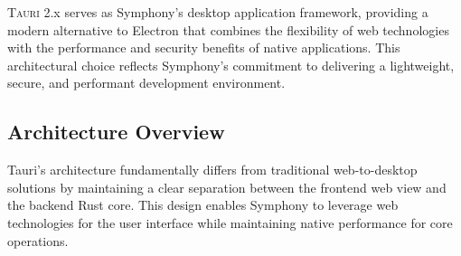 
\lettrine{T}{auri} 2.x serves as Symphony's desktop application framework, providing a modern alternative to Electron that combines the flexibility of web technologies with the performance and security benefits of native applications. This architectural choice reflects Symphony's commitment to delivering a lightweight, secure, and performant development environment.

\subsection*{Architecture Overview}

Tauri's architecture fundamentally differs from traditional web-to-desktop solutions by maintaining a clear separation between the frontend web view and the backend Rust core. This design enables Symphony to leverage web technologies for the user interface while maintaining native performance for core operations.

